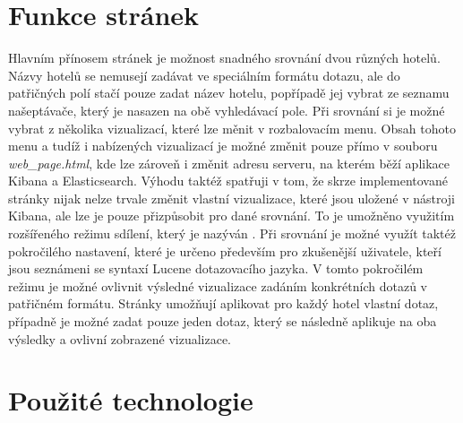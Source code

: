 \documentclass[czech,BP]{thesiskiv}
\begin{document}
\section{Funkce stránek}
Hlavním přínosem stránek je možnost snadného srovnání dvou různých hotelů. Názvy hotelů se nemusejí zadávat ve speciálním formátu dotazu, ale do patřičných polí stačí pouze zadat název hotelu, popřípadě jej vybrat ze  seznamu našeptávače, který je nasazen na obě vyhledávací pole. Při srovnání si je možné vybrat z několika vizualizací, které lze měnit v rozbalovacím menu. Obsah tohoto menu a tudíž i nabízených vizualizací je možné změnit pouze přímo v souboru \textit{web\_page.html}, kde lze zároveň i změnit adresu serveru, na kterém běží aplikace Kibana a Elasticsearch. Výhodu taktéž spatřuji v tom, že skrze implementované stránky nijak nelze trvale změnit vlastní vizualizace, které jsou uložené v nástroji Kibana, ale lze je pouze přizpůsobit pro dané srovnání. To je umožněno využitím rozšířeného režimu sdílení, který je nazýván . Při srovnání je možné využít taktéž pokročilého nastavení, které je určeno především pro zkušenější uživatele, kteří jsou seznámeni se syntaxí Lucene dotazovacího jazyka. V tomto pokročilém režimu je možné ovlivnit výsledné vizualizace zadáním konkrétních dotazů v patřičném formátu. Stránky umožňují aplikovat pro každý hotel vlastní dotaz, případně je možné zadat pouze jeden dotaz, který se následně aplikuje na oba výsledky a ovlivní zobrazené vizualizace.

\section{Použité technologie}
\end{document}
